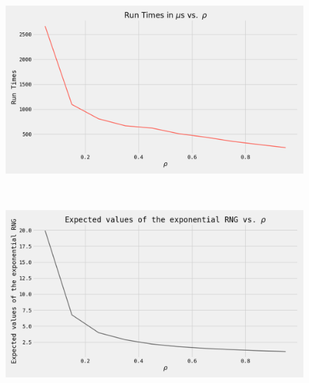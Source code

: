\begin{figure}[h!]
 \centering
 \captionsetup{justification=centering}
 \begin{minipage}[]{0.48\linewidth}
  \centering
 \includegraphics[width=\linewidth]{Figures/task5_1.png}
 \label{fig8} 
 \end{minipage}~\begin{minipage}  []{0.48\linewidth}
  \centering
  \includegraphics[width=\linewidth]{Figures/task5_2.png}
  \label{fig9}
 \end{minipage}
\end{figure}
